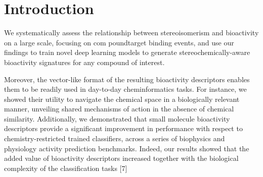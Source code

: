 \chapter{Introduction}
\label{introduction}
\newpage




\makeatletter
\newenvironment{figurehere}
{\def\@captype{figure}}
{}
\makeatother

\makeatletter
\newenvironment{Figure_modified}{%
\par\addvspace{12pt plus2pt}%
\def\@captype{figure}%
}{%
\par\addvspace{12pt plus2pt}%
}%

\newenvironment{Figure_modified2}{%
\par\addvspace{12pt plus2pt}%
\def\@captype{figure}%
\renewcommand{\@dblfloatplacement}{ht}%
\renewcommand{\@floatplacement}{ht}%
}{%
\par\addvspace{12pt plus2pt}%
}%

\long{}
\makeatother





We systematically assess the relationship between stereoisomerism and bioactivity on a large scale, focusing on com poundtarget binding events, and use our findings to train novel deep learning models to generate stereochemically-aware bioactivity signatures for any compound of interest.

Moreover, the vector-like format of the resulting bioactivity descriptors enables them to be readily used in day-to-day cheminformatics tasks. For instance, we showed their utility to navigate the chemical space in a biologically relevant manner, unveiling shared mechanisms of action in the absence of chemical similarity. Additionally, we demonstrated that small molecule bioactivity descriptors provide a significant improvement in performance with respect to chemistry-restricted trained classifiers, across a series of biophysics and physiology activity prediction benchmarks. Indeed, our results showed that the added value of bioactivity descriptors increased together with the biological complexity of the classification tasks [7]